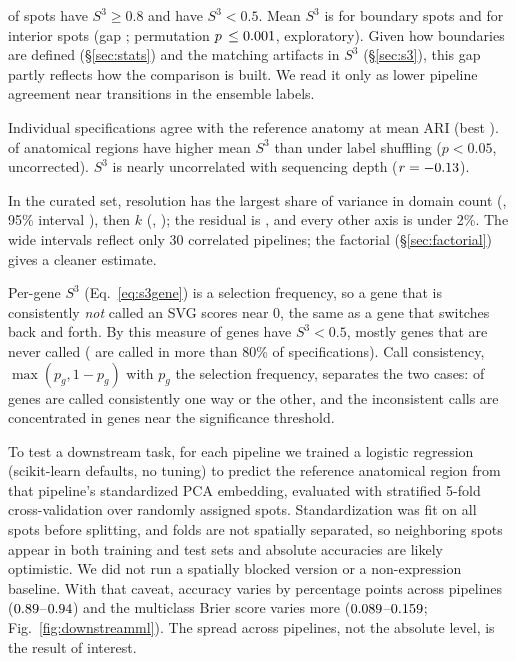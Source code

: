 \documentclass[conference]{IEEEtran}
\begin{document}
\SpotStableFrac{} of spots
have $S^3\ge0.8$ and \SpotFragileFrac{} have $S^3<0.5$. Mean $S^3$ is
\BoundaryS{} for boundary spots and \InteriorS{} for interior spots (gap
\StakesGap{}; permutation $p\,\le 0.001{}$, exploratory). Given how
boundaries are defined (\S\ref{sec:stats}) and the matching artifacts in
$S^3$ (\S\ref{sec:s3}), this gap partly reflects how the comparison is
built. We read it only as lower pipeline agreement near transitions in the
ensemble labels.

Individual
specifications agree with the reference anatomy at mean ARI \RefAriMean{}
(best \RefAriMax{}). \RegionsStable{} of \NregionsTotal{} anatomical regions
have higher mean $S^3$ than under label shuffling ($p<0.05$, uncorrected).
$S^3$ is nearly uncorrelated with sequencing depth ($r=-0.13{}$).

In the curated set, resolution has the
largest share of variance in domain count (\CatHneRes{}, 95\% interval \CatHneResCI{}), then $k$
(\CatHneK{}, \CatHneKCI{}); the residual is \CatHneResid{}, and every
other axis is under 2\%. The wide intervals reflect only 30 correlated
pipelines; the factorial (\S\ref{sec:factorial}) gives a cleaner estimate.

Per-gene $S^3$ (Eq.~\ref{eq:s3gene}) is a
selection frequency, so a gene that is consistently \emph{not} called an
SVG scores near 0, the same as a gene that switches back and forth. By this
measure \GeneSelFreqLowFrac{} of genes have $S^3<0.5$, mostly genes that
are never called (\GeneRobustFrac{} are called in more than 80\% of
specifications). Call consistency, $\max(p_g,1-p_g)$ with $p_g$ the
selection frequency, separates the two cases: \GeneConsistentFrac{} of
genes are called consistently one way or the other, and the inconsistent
calls are concentrated in genes near the significance threshold.

To test a downstream task, for each pipeline we trained a
logistic regression (scikit-learn defaults, no tuning) to predict the
reference anatomical region from that pipeline's standardized PCA
embedding, evaluated with stratified 5-fold cross-validation over randomly
assigned spots. Standardization was fit on all spots before splitting, and
folds are not spatially separated, so neighboring spots appear in both
training and test sets and absolute accuracies are likely optimistic. We
did not run a spatially blocked version or a non-expression baseline. With
that caveat, accuracy varies by \DownstreamRangePP{} percentage points
across pipelines ($0.89{}$--$0.94{}$) and the
multiclass Brier score varies more ($0.089{}$--$0.159{}$;
Fig.~\ref{fig:downstreamml}). The spread across pipelines, not the
absolute level, is the result of interest.
\end{document}
